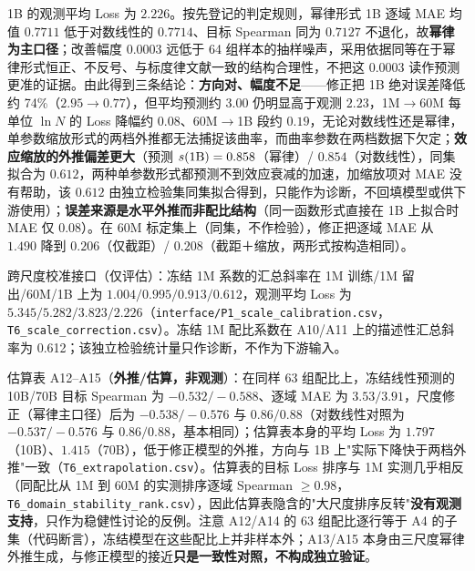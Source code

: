 1B 的观测平均 Loss 为 $2.226$。按先登记的判定规则，幂律形式 1B 逐域 MAE 均值 $0.7711$ 低于对数线性的 $0.7714$、目标 Spearman 同为 $0.7127$ 不退化，故\textbf{幂律为主口径}；改善幅度 $0.0003$ 远低于 64 组样本的抽样噪声，采用依据同等在于幂律形式恒正、不反号、与标度律文献一致的结构合理性，不把这 $0.0003$ 读作预测更准的证据。由此得到三条结论：\textbf{方向对、幅度不足}——修正把 1B 绝对误差降低约 74\%（$2.95\to0.77$），但平均预测约 $3.00$ 仍明显高于观测 $2.23$，1M$\to$60M 每单位 $\ln N$ 的 Loss 降幅约 $0.08$、60M$\to$1B 段约 $0.19$，无论对数线性还是幂律，单参数缩放形式的两档外推都无法捕捉该曲率，而曲率参数在两档数据下欠定；\textbf{效应缩放的外推偏差更大}（预测 $s(1{\rm B})=0.858$（幂律）/ $0.854$（对数线性），同集拟合为 $0.612$，两种单参数形式都预测不到效应衰减的加速，加缩放项对 MAE 没有帮助，该 $0.612$ 由独立检验集同集拟合得到，只能作为诊断，不回填模型或供下游使用）；\textbf{误差来源是水平外推而非配比结构}（同一函数形式直接在 1B 上拟合时 MAE 仅 $0.08$）。在 60M 标定集上（同集，不作检验），修正把逐域 MAE 从 $1.490$ 降到 $0.206$（仅截距）/ $0.208$（截距＋缩放，两形式按构造相同）。

跨尺度校准接口（仅评估）：冻结 1M 系数的汇总斜率在 1M 训练/1M 留出/60M/1B 上为 $1.004/0.995/0.913/0.612$，观测平均 Loss 为 $5.345/5.282/3.823/2.226$（\texttt{interface/P1\_scale\_calibration.csv}，\texttt{T6\_scale\_correction.csv}）。冻结 1M 配比系数在 A10/A11 上的描述性汇总斜率为 0.612；该独立检验统计量只作诊断，不作为下游输入。

估算表 A12–A15（\textbf{外推/估算，非观测}）：在同样 63 组配比上，冻结线性预测的 10B/70B 目标 Spearman 为 $-0.532/-0.588$、逐域 MAE 为 $3.53/3.91$，尺度修正（幂律主口径）后为 $-0.538/-0.576$ 与 $0.86/0.88$（对数线性对照为 $-0.537/-0.576$ 与 $0.86/0.88$，基本相同）；估算表本身的平均 Loss 为 $1.797$（10B）、$1.415$（70B），低于修正模型的外推，方向与 1B 上"实际下降快于两档外推"一致（\texttt{T6\_extrapolation.csv}）。估算表的目标 Loss 排序与 1M 实测几乎相反（同配比从 1M 到 60M 的实测排序逐域 Spearman $\ge0.98$，\texttt{T6\_domain\_stability\_rank.csv}），因此估算表隐含的"大尺度排序反转"\textbf{没有观测支持}，只作为稳健性讨论的反例。注意 A12/A14 的 63 组配比逐行等于 A4 的子集（代码断言），冻结模型在这些配比上并非样本外；A13/A15 本身由三尺度幂律外推生成，与修正模型的接近\textbf{只是一致性对照，不构成独立验证}。

